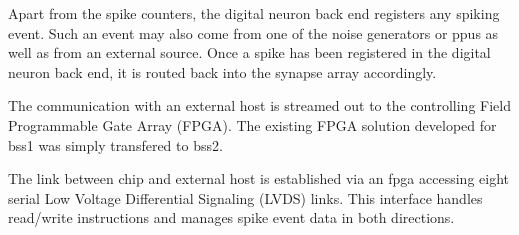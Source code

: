 Apart from the spike counters, the digital neuron back end registers any spiking event. Such an event may also come from one of the noise generators or \glspl{ppu} as well as from an external source. Once a spike has been registered in the digital neuron back end, it is routed back into the synapse array accordingly. 

The communication with an external host is streamed out to the controlling Field Programmable Gate Array (FPGA). The existing FPGA solution developed for \gls{bss1} was simply transfered to \gls{bss2}.

The link between chip and external host is established via an \gls{fpga} accessing eight serial Low Voltage Differential Signaling (LVDS) links. This interface handles read/write instructions and manages spike event data in both directions. %